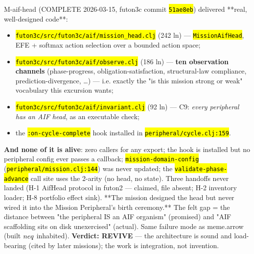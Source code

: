 \documentclass[11pt,oneside]{article}
\newcommand{\scopehl}[1]{\texttt{\hl{#1}}}
\begin{document}
\begin{phasebox}[title={2. MAP (2026-06-10) --- autopsy + the futon5 improvisation apparatus}]

\begin{subbox}[title={2.1 M-aif-head autopsy: built, 0\% wired --- the head never attended the birth}]

M-aif-head (COMPLETE 2026-03-15, futon3c commit \scopehl{51ae8eb}) delivered **real,
well-designed code**:
\begin{itemize}[leftmargin=1.2em,itemsep=1pt]
\item \scopehl{futon3c/src/futon3c/aif/mission\_head.clj} (242 ln) --- \scopehl{MissionAifHead}, EFE + softmax action selection over a bounded action space;
\item \scopehl{futon3c/src/futon3c/aif/observe.clj} (186 ln) --- \textbf{ten observation channels} (phase-progress, obligation-satisfaction, structural-law compliance, prediction-divergence, \ldots{}) --- i.e. exactly the "is this mission strong or weak" vocabulary this excursion wants;
\item \scopehl{futon3c/src/futon3c/aif/invariant.clj} (92 ln) --- C9: \emph{every peripheral has an AIF head}, as an executable check;
\item the \scopehl{:on-cycle-complete} hook installed in \scopehl{peripheral/cycle.clj:159}.
\end{itemize}

\textbf{And none of it is alive}: zero callers for any export; the hook is
installed but no peripheral config ever passes a callback;
\scopehl{mission-domain-config} (\scopehl{peripheral/mission.clj:144}) was never updated; the
\scopehl{validate-phase-advance} call site uses the 2-arity (no head, no state). Three
handoffs never landed (H-1 AifHead protocol in futon2 --- claimed, file absent;
H-2 inventory loader; H-8 portfolio effect sink). **The mission designed the
head but never wired it into the Mission Peripheral's birth ceremony.** The
felt gap = the distance between "the peripheral IS an AIF organism" (promised)
and "AIF scaffolding sits on disk unexercised" (actual). Same failure mode as
meme.arrow (built $\\neq$ inhabited). \textbf{Verdict: REVIVE} --- the architecture is
sound and load-bearing (cited by later missions); the work is integration,
not invention.

\end{subbox}
\begin{subbox}[title={2.2 futon5: the patterns-of-improvisation apparatus (ACTIVE --- latest commit 2026-06-09)}]


\end{subbox}
\end{phasebox}
\end{document}
